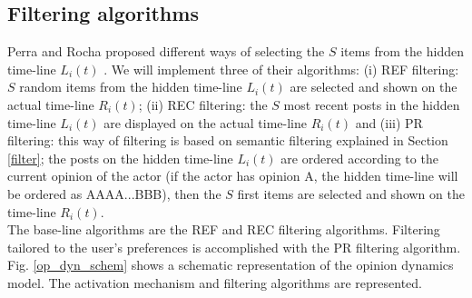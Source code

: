 \documentclass[11 pt , letterpaper , twoside , openright]{book}
\begin{document}
\subsection{Filtering algorithms}

Perra and Rocha proposed different ways of selecting the $S$ items from the hidden time-line $L_i(t)$ \cite{Perra2019}. We will implement three of their algorithms: (i) REF filtering: $S$ random items from the hidden time-line $L_i(t)$ are selected and shown on the actual time-line $R_i(t)$; (ii) REC filtering: the $S$ most recent posts in the hidden time-line $L_i(t)$ are displayed on the actual time-line $R_i(t)$ and (iii) PR filtering: this way of filtering is based on semantic filtering explained in Section \ref{filter}; the posts on the hidden time-line $L_i(t)$ are ordered according to the current opinion of the actor (if the actor has opinion A, the hidden time-line will be ordered as AAAA...BBB), then the $S$ first items are selected and shown on the time-line $R_i(t)$.\\
\newline
The base-line algorithms are the REF and REC filtering algorithms. Filtering tailored to the user's preferences is accomplished with the PR filtering algorithm.\\
\newline
Fig. \ref{op_dyn_schem} shows a schematic representation of the opinion dynamics model. The activation mechanism and filtering algorithms are represented. 
\end{document}
